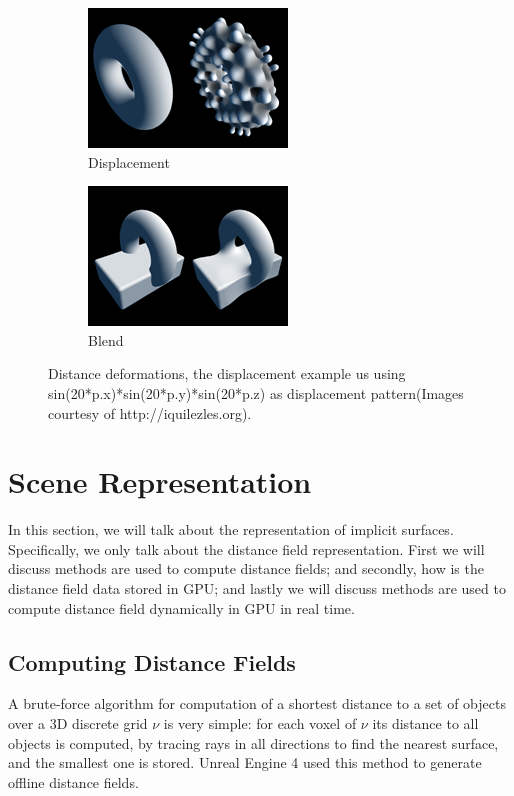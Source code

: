 \begin{figure}\label{f:object-mobility}
	\begin{subfigure}[b]{.50\textwidth}
		\includegraphics{graphics/df/displacement}
		\caption{Displacement}
	\end{subfigure}
	\begin{subfigure}[b]{.50\textwidth}
		\includegraphics{graphics/df/blend}
		\caption{Blend}
	\end{subfigure}
	\caption{Distance deformations, the displacement example us using sin(20*p.x)*sin(20*p.y)*sin(20*p.z) as displacement pattern(Images courtesy of http://iquilezles.org).}
\end{figure}









\chapter{Scene Representation}
In this section, we will talk about the representation of implicit surfaces. Specifically, we only talk about the distance field representation. First we will discuss methods are used to compute distance fields; and secondly, how is the distance field data stored in GPU; and lastly we will discuss methods are used to compute distance field dynamically in GPU in real time.  

\section{Computing Distance Fields}
A brute-force algorithm for computation of a shortest distance to a set of objects over a 3D discrete grid $\nu$ is very simple: for each voxel of $\nu$ its distance to all objects is computed, by tracing rays in all directions to find the nearest surface, and the smallest one is stored. Unreal Engine 4 used this method to generate offline distance fields.

